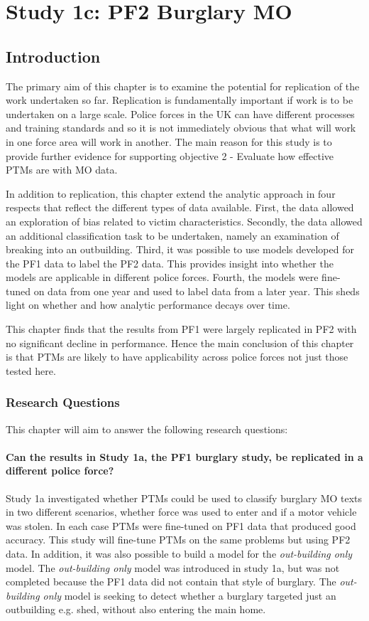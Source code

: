 \chapter{Study 1c: PF2 Burglary MO}

\section{Introduction} The primary aim of this chapter is to examine the potential for replication of the work undertaken so far. Replication is fundamentally important if work is to be undertaken on a large scale. Police forces in the UK can have different processes and training standards and so it is not immediately obvious that what will work in one force area will work in another. The main reason for this study is to provide further evidence for supporting objective 2 - Evaluate how effective PTMs are with MO data.
 
In addition to replication, this chapter  extend the analytic approach in four respects that reflect the different types of data available. First, the data allowed an exploration of bias related to victim characteristics. Secondly, the data allowed an additional classification task to be undertaken, namely an examination of breaking into an outbuilding. Third, it was possible to use models developed for the PF1 data to label the PF2 data. This provides insight into whether the models are applicable in different police forces.  Fourth,  the models were fine-tuned on data from one year and used to label data from a later year. This sheds light on  whether and how analytic performance decays over time.

This chapter finds that the results from PF1 were largely replicated in PF2 with no significant decline in performance.  Hence the main conclusion of this chapter is that PTMs are likely to have applicability across police forces not just those tested here.  

\subsection{Research Questions} This chapter will aim to answer the following research questions:

\subsubsection{Can the results in Study 1a, the PF1 burglary study, be replicated in a different police force?} Study 1a investigated whether PTMs could be used to classify burglary MO texts in two different scenarios, whether force was used to enter and if a motor vehicle was stolen. In each case PTMs were fine-tuned on PF1 data that produced good accuracy. This study will fine-tune PTMs on the same problems but using PF2 data.  In addition, it was also possible to build a model for the \emph{out-building only} model. The \emph{out-building only} model was introduced in study 1a, but was not completed because the PF1 data did not contain that style of burglary. The \emph{out-building only} model is seeking to detect whether a burglary targeted just an outbuilding e.g. shed, without also entering the main home.

